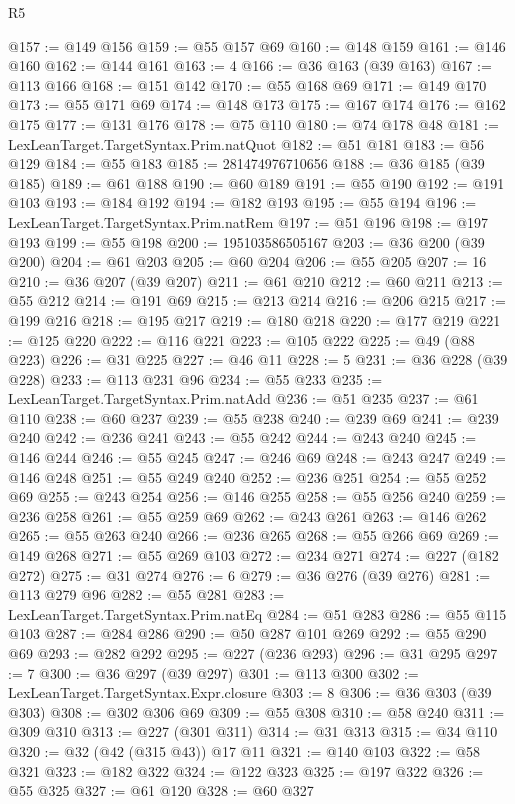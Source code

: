 \begin{lexlean}{R5}
\begin{coremodule}
@157 := @149 @156
@159 := @55 @157 @69
@160 := @148 @159
@161 := @146 @160
@162 := @144 @161
@163 := 4
@166 := @36 @163 (@39 @163)
@167 := @113 @166
@168 := @151 @142
@170 := @55 @168 @69
@171 := @149 @170
@173 := @55 @171 @69
@174 := @148 @173
@175 := @167 @174
@176 := @162 @175
@177 := @131 @176
@178 := @75 @110
@180 := @74 @178 @48
@181 := LexLeanTarget.TargetSyntax.Prim.natQuot
@182 := @51 @181
@183 := @56 @129
@184 := @55 @183
@185 := 281474976710656
@188 := @36 @185 (@39 @185)
@189 := @61 @188
@190 := @60 @189
@191 := @55 @190
@192 := @191 @103
@193 := @184 @192
@194 := @182 @193
@195 := @55 @194
@196 := LexLeanTarget.TargetSyntax.Prim.natRem
@197 := @51 @196
@198 := @197 @193
@199 := @55 @198
@200 := 195103586505167
@203 := @36 @200 (@39 @200)
@204 := @61 @203
@205 := @60 @204
@206 := @55 @205
@207 := 16
@210 := @36 @207 (@39 @207)
@211 := @61 @210
@212 := @60 @211
@213 := @55 @212
@214 := @191 @69
@215 := @213 @214
@216 := @206 @215
@217 := @199 @216
@218 := @195 @217
@219 := @180 @218
@220 := @177 @219
@221 := @125 @220
@222 := @116 @221
@223 := @105 @222
@225 := @49 (@88 @223)
@226 := @31 @225
@227 := @46 @11
@228 := 5
@231 := @36 @228 (@39 @228)
@233 := @113 @231 @96
@234 := @55 @233
@235 := LexLeanTarget.TargetSyntax.Prim.natAdd
@236 := @51 @235
@237 := @61 @110
@238 := @60 @237
@239 := @55 @238
@240 := @239 @69
@241 := @239 @240
@242 := @236 @241
@243 := @55 @242
@244 := @243 @240
@245 := @146 @244
@246 := @55 @245
@247 := @246 @69
@248 := @243 @247
@249 := @146 @248
@251 := @55 @249 @240
@252 := @236 @251
@254 := @55 @252 @69
@255 := @243 @254
@256 := @146 @255
@258 := @55 @256 @240
@259 := @236 @258
@261 := @55 @259 @69
@262 := @243 @261
@263 := @146 @262
@265 := @55 @263 @240
@266 := @236 @265
@268 := @55 @266 @69
@269 := @149 @268
@271 := @55 @269 @103
@272 := @234 @271
@274 := @227 (@182 @272)
@275 := @31 @274
@276 := 6
@279 := @36 @276 (@39 @276)
@281 := @113 @279 @96
@282 := @55 @281
@283 := LexLeanTarget.TargetSyntax.Prim.natEq
@284 := @51 @283
@286 := @55 @115 @103
@287 := @284 @286
@290 := @50 @287 @101 @269
@292 := @55 @290 @69
@293 := @282 @292
@295 := @227 (@236 @293)
@296 := @31 @295
@297 := 7
@300 := @36 @297 (@39 @297)
@301 := @113 @300
@302 := LexLeanTarget.TargetSyntax.Expr.closure
@303 := 8
@306 := @36 @303 (@39 @303)
@308 := @302 @306 @69
@309 := @55 @308
@310 := @58 @240
@311 := @309 @310
@313 := @227 (@301 @311)
@314 := @31 @313
@315 := @34 @110
@320 := @32 (@42 (@315 @43)) @17 @11
@321 := @140 @103
@322 := @58 @321
@323 := @182 @322
@324 := @122 @323
@325 := @197 @322
@326 := @55 @325
@327 := @61 @120
@328 := @60 @327

\end{coremodule}
\end{lexlean}
